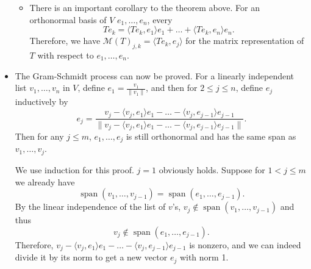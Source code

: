 \documentclass[11pt]{article}
\newcommand{\s}{\operatorname{span}}
\newcommand{\inp}[2]{\langle #1, #2 \rangle}
\newcommand{\nm}[1]{\|#1\|}
\newcommand{\M}{\mathcal{M}}
\begin{document}
\begin{itemize}
    \begin{itemize}
        \item There is an important corollary to the theorem above. For an orthonormal basis of $V$ $e_1,\dots,e_n$, every $$Te_k = \inp{Te_k}{e_1}e_1 + \dots + \inp{Te_k}{e_n}e_n.$$ Therefore, we have $\M(T)_{j,k} = \inp{Te_k}{e_j}$ for the matrix representation of $T$ with respect to $e_1,\dots,e_n$.
    \end{itemize}
    \item The Gram-Schmidt process can now be proved. For a linearly independent list $v_1,\dots,v_n$ in $V$, define $e_1 = \frac{v_1}{\nm{v_1}}$, and then for $2 \leq j \leq n$, define $e_j$ inductively by $$e_j = \frac{v_j - \inp{v_j}{e_1}e_1 - \dots - \inp{v_j}{e_{j-1}}e_{j-1}}{\nm{v_j - \inp{v_j}{e_1}e_1 - \dots - \inp{v_j}{e_{j-1}}e_{j-1}}}.$$ Then for any $j \leq m$, $e_1, \dots, e_j$ is still orthonormal and has the same span as $v_1,\dots,v_j$. 
    
    We use induction for this proof. $j = 1$ obviously holds. Suppose for $1 < j \leq m$ we already have \[\s(v_1,\dots,v_{j-1}) = \s(e_1,\dots,e_{j-1}).\] By the linear independence of the list of $v$'s, $v_j \notin \s(v_1,\dots,v_{j-1})$ and thus \[v_j \notin \s(e_1,\dots,e_{j-1}).\] Therefore, $v_j - \inp{v_j}{e_1}e_1 - \dots - \inp{v_j}{e_{j-1}}e_{j-1}$ is nonzero, and we can indeed divide it by its norm to get a new vector $e_j$ with norm 1.
    

\end{itemize}
\end{document}
